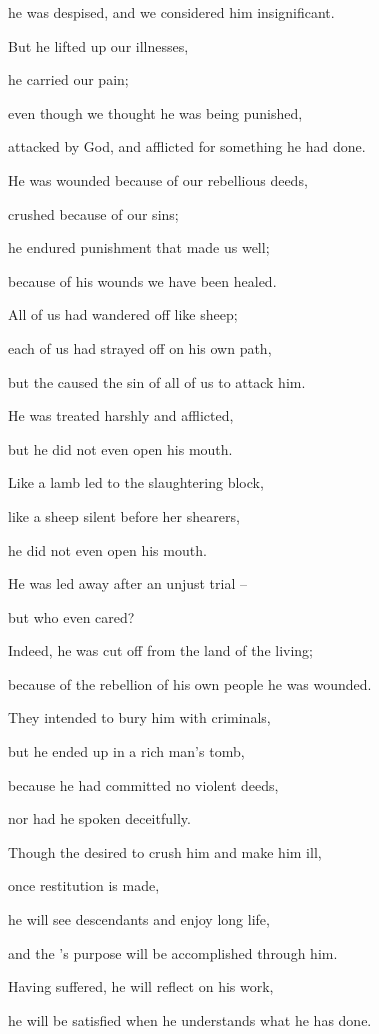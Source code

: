 {\par }{\Q he was despised,
and we considered him insignificant.
\par }{\Q {}But
he lifted up our illnesses,
\par }{\Q he carried
our pain;
\par }{\Q even though we
thought
he was
being punished,
\par }{\Q attacked
by God,
and afflicted for something he had done.
\par }{\Q {}He was
wounded
because of our rebellious
deeds,
\par }{\Q crushed
because of our sins;
\par }{\Q he endured
punishment that made us well;
\par }{\Q because of his wounds
we have been healed.
\par }{\Q {}All
of us had wandered
off like sheep;
\par }{\Q each
of us had strayed
off on his own path,
\par }{\Q but
the {}
caused
the sin
of all
of us to attack him.
\par }{\Q {}He was treated harshly
and afflicted,
\par }{\Q but he did not
even open
his mouth.
\par }{\Q Like a lamb
led
to the slaughtering
block,
\par }{\Q like a sheep
silent
before
her shearers,
\par }{\Q he did not
even open
his mouth.
\par }{\Q {}He was led away
after an unjust trial –
\par }{\Q but who
even cared?

\par }{\Q Indeed,
he was cut
off from the land
of the living;
\par }{\Q because of the rebellion
of his own people
he was wounded.
\par }{\Q {}They intended to bury
him with criminals,
\par }{\Q but he ended up in a rich
man’s tomb,
\par }{\Q because
he had committed no
violent
deeds,
\par }{\Q nor
had he spoken
deceitfully.
\par }{\Q {}Though the
{}
desired
to crush
him and make him ill,
\par }{\Q once restitution
is made,
\par }{\Q he will see
descendants
and enjoy long
life,
\par }{\Q and the
{}’s
purpose
will be accomplished through him.
\par }{\Q {}Having
suffered,
he will reflect
on his work,
\par }{\Q he will be satisfied
when he understands
what he has done.

}

